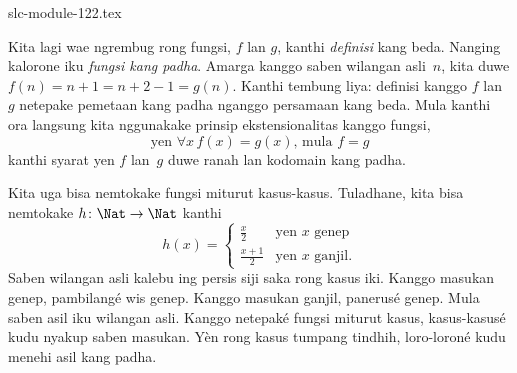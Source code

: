 \begin{filecontents*}[overwrite]{slc-module-122.tex}
\begin{explain}
Kita lagi wae ngrembug rong fungsi,
$f$ lan $g$, kanthi \emph{definisi}
kang beda. Nanging kalorone iku
\emph{fungsi kang padha}.
Amarga kanggo saben wilangan asli~$n$,
kita duwe $f(n) = n+1 = n+2-1 =g(n)$.
Kanthi tembung liya: definisi kanggo $f$
lan~$g$ netepake pemetaan kang padha
nganggo persamaan kang beda.
Mula kanthi ora langsung kita nggunakake
prinsip ekstensionalitas kanggo fungsi,
\[
  \text{yen }\forall x\, f(x) = g(x)\text{, mula }f = g
\]
kanthi syarat yen $f$ lan~$g$ duwe ranah lan
kodomain kang padha.
\end{explain}

\begin{ex}
Kita uga bisa nemtokake fungsi miturut
kasus-kasus. Tuladhane, kita bisa
nemtokake $h \colon \Nat \to \Nat$ kanthi
\[
h(x) =
\begin{cases}
  \frac{x}{2} & \text{yen $x$ genep} \\
  \frac{x+1}{2} & \text{yen $x$ ganjil.}
\end{cases}
\]
Saben wilangan asli kalebu ing persis siji saka rong kasus iki.
Kanggo masukan genep, pambilangé wis genep. Kanggo masukan ganjil,
panerusé genep. Mula saben asil iku wilangan asli.
Kanggo netepaké fungsi miturut kasus, kasus-kasusé kudu nyakup
saben masukan. Yèn rong kasus tumpang tindhih, loro-loroné kudu menehi asil kang padha.
\end{ex}


\end{filecontents*}

